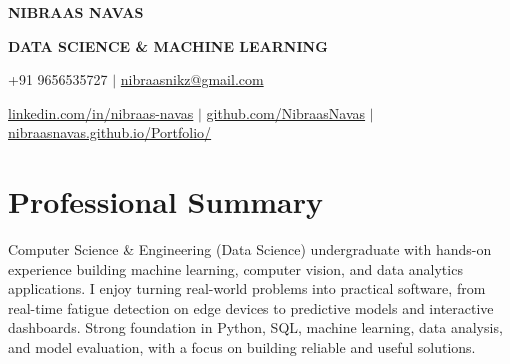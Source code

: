 \documentclass[10pt,a4paper]{article}
\begin{document}

\begin{center}

    {\fontsize{22}{24}\selectfont
    \textbf{\color{heading}NIBRAAS NAVAS}}

    \vspace{3pt}

    {\normalsize
    \textbf{\color{accent}DATA SCIENCE \& MACHINE LEARNING}}

    \vspace{6pt}

    {\small
    +91 9656535727
    \quad $\vert$ \quad
    \href{mailto:nibraasnikz@gmail.com}{nibraasnikz@gmail.com}
    }

    \vspace{3pt}

    {\footnotesize
    \href{https://linkedin.com/in/nibraas-navas}
    {linkedin.com/in/nibraas-navas}
    \quad $\vert$ \quad
    \href{https://github.com/NibraasNavas}
    {github.com/NibraasNavas}
    \quad $\vert$ \quad
    \href{https://nibraasnavas.github.io/Portfolio/}
    {nibraasnavas.github.io/Portfolio/}
    }

\end{center}

\vspace{-2pt}


\section{Professional Summary}

Computer Science \& Engineering (Data Science) undergraduate with hands-on experience
building machine learning, computer vision, and data analytics applications. I enjoy
turning real-world problems into practical software, from real-time fatigue detection
on edge devices to predictive models and interactive dashboards. Strong foundation in
Python, SQL, machine learning, data analysis, and model evaluation, with a focus on
building reliable and useful solutions.

\end{document}
